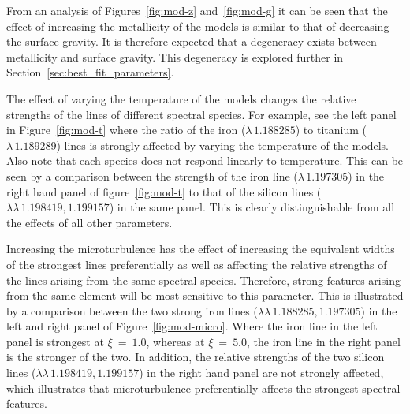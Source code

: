 From an analysis of Figures~\ref{fig:mod-z} and~\ref{fig:mod-g} it can be seen that the effect of increasing the metallicity of the models is similar to that of decreasing the surface gravity.
It is therefore expected that a degeneracy exists between metallicity and surface gravity.
This degeneracy is explored further in Section~\ref{sec:best_fit_parameters}.

The effect of varying the temperature of the models changes the relative strengths of the lines of different spectral species.
For example, see the left panel in Figure~\ref{fig:mod-t} where the ratio of the iron
($\lambda\,1.188285$) to titanium ($\lambda\,1.189289$) lines is strongly affected by varying the temperature of the models.
Also note that each species does not respond linearly to temperature.
This can be seen by a comparison between the strength of the iron line
($\lambda\,1.197305$) in the right hand panel of figure~\ref{fig:mod-t} to that of the silicon lines
($\lambda\lambda\,1.198419, 1.199157$) in the same panel.
This is clearly distinguishable from all the effects of all other parameters.


Increasing the microturbulence has the effect of increasing the equivalent widths
of the strongest lines preferentially as well as affecting the relative strengths of the lines arising from the same spectral species.
Therefore, strong features arising from the same element will be most sensitive to this
parameter.
This is illustrated by a comparison between the two strong iron lines
($\lambda\lambda\,1.188285, 1.197305$) in the left and
right panel of Figure~\ref{fig:mod-micro}.
Where the iron line in the left panel is strongest at $\xi~=~1.0$,
whereas at $\xi~=~5.0$, the iron line in the right panel is the stronger of the two.
In addition, the relative strengths of the two silicon lines
($\lambda\lambda\,1.198419, 1.199157$) in the right hand panel are not strongly affected, which illustrates that microturbulence preferentially affects the strongest spectral features.

